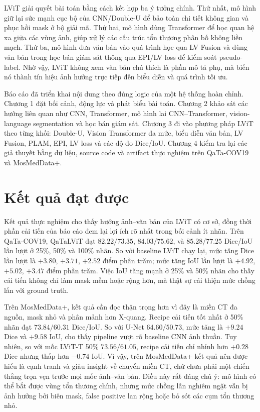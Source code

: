 LViT giải quyết bài toán bằng cách kết hợp ba ý tưởng chính. Thứ nhất, mô hình giữ lại sức mạnh cục bộ của CNN/Double-U để bảo toàn chi tiết không gian và phục hồi mask ở bộ giải mã. Thứ hai, mô hình dùng Transformer để học quan hệ xa giữa các vùng ảnh, giúp xử lý các cấu trúc tổn thương phân bố không liền mạch. Thứ ba, mô hình đưa văn bản vào quá trình học qua LV Fusion và dùng văn bản trong học bán giám sát thông qua EPI/LV loss để kiểm soát pseudo-label. Nhờ vậy, LViT không xem văn bản chú thích là phần mô tả phụ, mà biến nó thành tín hiệu ảnh hưởng trực tiếp đến biểu diễn và quá trình tối ưu.

Báo cáo đã triển khai nội dung theo đúng logic của một hệ thống hoàn chỉnh. Chương 1 đặt bối cảnh, động lực và phát biểu bài toán. Chương 2 khảo sát các hướng liên quan như CNN, Transformer, mô hình lai CNN--Transformer, vision-language segmentation và học bán giám sát. Chương 3 đi vào phương pháp LViT theo từng khối: Double-U, Vision Transformer đa mức, biểu diễn văn bản, LV Fusion, PLAM, EPI, LV loss và các độ đo Dice/IoU. Chương 4 kiểm tra lại các giả thuyết bằng dữ liệu, source code và artifact thực nghiệm trên QaTa-COV19 và MosMedData+.

\section{Kết quả đạt được}

Kết quả thực nghiệm cho thấy hướng ảnh--văn bản của LViT có cơ sở, đồng thời phần cải tiến của báo cáo đem lại lợi ích rõ nhất trong bối cảnh ít nhãn. Trên QaTa-COV19, QaTaLViT đạt \(82.22/73.35\), \(84.03/75.62\), và \(85.28/77.25\) Dice/IoU lần lượt ở 25\%, 50\% và 100\% nhãn. So với baseline LViT chạy lại, mức tăng Dice lần lượt là \(+3.80\), \(+3.71\), \(+2.52\) điểm phần trăm; mức tăng IoU lần lượt là \(+4.92\), \(+5.02\), \(+3.47\) điểm phần trăm. Việc IoU tăng mạnh ở 25\% và 50\% nhãn cho thấy cải tiến không chỉ làm mask mềm hoặc rộng hơn, mà thật sự cải thiện mức chồng lấn với ground truth.

Trên MosMedData+, kết quả cần đọc thận trọng hơn vì đây là miền CT đa nguồn, mask nhỏ và phân mảnh hơn X-quang. Recipe cải tiến tốt nhất ở 50\% nhãn đạt \(73.84/60.31\) Dice/IoU. So với U-Net \(64.60/50.73\), mức tăng là \(+9.24\) Dice và \(+9.58\) IoU, cho thấy pipeline vượt rõ baseline CNN ảnh thuần. Tuy nhiên, so với mốc LViT-T 50\% \(73.56/61.05\), recipe cải tiến chỉ nhỉnh hơn \(+0.28\) Dice nhưng thấp hơn \(-0.74\) IoU. Vì vậy, trên MosMedData+ kết quả nên được hiểu là cạnh tranh và giàu insight về chuyển miền CT, chứ chưa phải một chiến thắng trọn vẹn trước mọi mốc ảnh--văn bản. Điều này rất đáng chú ý: mô hình có thể bắt được vùng tổn thương chính, nhưng mức chồng lấn nghiêm ngặt vẫn bị ảnh hưởng bởi biên mask, false positive lan rộng hoặc bỏ sót các cụm tổn thương nhỏ.

